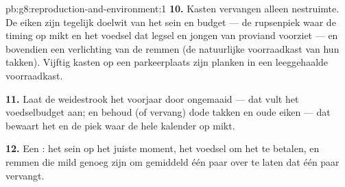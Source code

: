 \begin{solution}{pb:g8:reproduction-and-environment:1}
\textbf{10.} Kasten vervangen alleen nestruimte. De eiken zijn tegelijk
doelwit van het sein en budget --- de rupsenpiek waar de timing op mikt en
het voedsel dat legsel en jongen van proviand voorziet --- en bovendien
een verlichting van de remmen (de natuurlijke voorraadkast van hun takken).
Vijftig kasten op een parkeerplaats zijn planken in een leeggehaalde
voorraadkast.

\textbf{11.} Laat de weidestrook het voorjaar door ongemaaid --- dat vult
het voedselbudget aan; en behoud (of vervang) dode takken en oude eiken ---
dat bewaart het  en de piek waar de hele kalender op mikt.

\textbf{12.} Een : het sein op het juiste moment, het voedsel om
het te betalen, en remmen die mild genoeg zijn om gemiddeld één paar over
te laten dat één paar vervangt.
\end{solution}
